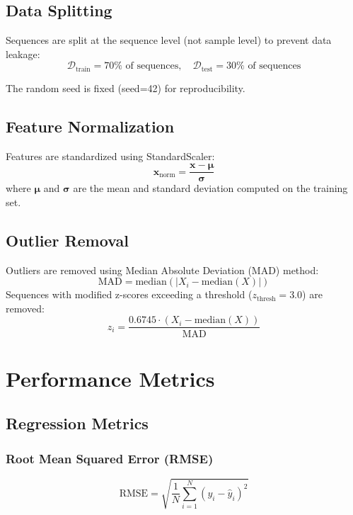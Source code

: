 \documentclass[11pt,a4paper]{article}
\begin{document}
\subsection{Data Splitting}

Sequences are split at the sequence level (not sample level) to prevent data leakage:
\begin{equation}
\mathcal{D}_{\text{train}} = 70\% \text{ of sequences}, \quad \mathcal{D}_{\text{test}} = 30\% \text{ of sequences}
\end{equation}

The random seed is fixed (seed=42) for reproducibility.

\subsection{Feature Normalization}

Features are standardized using StandardScaler:
\begin{equation}
\mathbf{x}_{\text{norm}} = \frac{\mathbf{x} - \boldsymbol{\mu}}{\boldsymbol{\sigma}}
\end{equation}
where $\boldsymbol{\mu}$ and $\boldsymbol{\sigma}$ are the mean and standard deviation computed on the training set.

\subsection{Outlier Removal}

Outliers are removed using Median Absolute Deviation (MAD) method:
\begin{equation}
\text{MAD} = \text{median}(|X_i - \text{median}(X)|)
\end{equation}
Sequences with modified z-scores exceeding a threshold ($z_{\text{thresh}} = 3.0$) are removed:
\begin{equation}
z_i = \frac{0.6745 \cdot (X_i - \text{median}(X))}{\text{MAD}}
\end{equation}

\section{Performance Metrics}

\subsection{Regression Metrics}

\subsubsection{Root Mean Squared Error (RMSE)}
\begin{equation}
\text{RMSE} = \sqrt{\frac{1}{N} \sum_{i=1}^{N} (y_i - \hat{y}_i)^2}
\end{equation}
\end{document}
